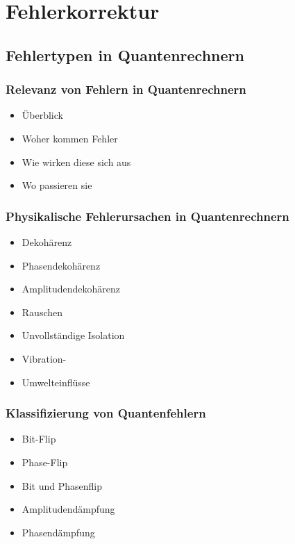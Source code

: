 \chapter{Fehlerkorrektur}
\label{error_correction} %



\section{Fehlertypen in Quantenrechnern}\label{chap:QEC1}

\subsection{Relevanz von Fehlern in Quantenrechnern}
\begin{itemize}
\item Überblick
\item Woher kommen Fehler
\item Wie wirken diese sich aus
\item Wo passieren sie
\end{itemize}

\subsection{Physikalische Fehlerursachen in Quantenrechnern}
\begin{itemize}
\item Dekohärenz
\item Phasendekohärenz
\item Amplitudendekohärenz 
\item Rauschen
\item Unvollständige Isolation 
\item Vibration-
\item Umwelteinflüsse
\end{itemize}

\subsection{Klassifizierung von Quantenfehlern}
\begin{itemize}
\item Bit-Flip
\item Phase-Flip
\item Bit und Phasenflip
\item Amplitudendämpfung
\item Phasendämpfung
\end{itemize}



